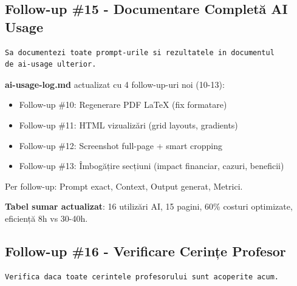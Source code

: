 \documentclass[11pt,a4paper]{article}
\begin{document}
\subsection{Follow-up \#15 - Documentare Completă AI Usage}

\begin{tcolorbox}[colback=promptbackground,colframe=blue!75!black,title=Prompt Input]
\begin{verbatim}
Sa documentezi toate prompt-urile si rezultatele in documentul
de ai-usage ulterior.
\end{verbatim}
\end{tcolorbox}

\begin{tcolorbox}[colback=outputbackground,colframe=green!75!black,title=Output Generat]
\textbf{ai-usage-log.md} actualizat cu 4 follow-up-uri noi (10-13):
\begin{itemize}[leftmargin=*]
    \item Follow-up \#10: Regenerare PDF LaTeX (fix formatare)
    \item Follow-up \#11: HTML vizualizări (grid layouts, gradients)
    \item Follow-up \#12: Screenshot full-page + smart cropping
    \item Follow-up \#13: Îmbogățire secțiuni (impact financiar, cazuri, beneficii)
\end{itemize}

Per follow-up: Prompt exact, Context, Output generat, Metrici.

\textbf{Tabel sumar actualizat}: 16 utilizări AI, 15 pagini, 60\% costuri optimizate, eficiență 8h vs 30-40h.
\end{tcolorbox}

\subsection{Follow-up \#16 - Verificare Cerințe Profesor}

\begin{tcolorbox}[colback=promptbackground,colframe=blue!75!black,title=Prompt Input]
\begin{verbatim}
Verifica daca toate cerintele profesorului sunt acoperite acum.
\end{verbatim}
\end{tcolorbox}
\end{document}
